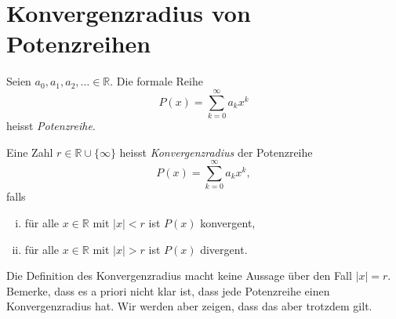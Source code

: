 \documentclass[../main.tex]{subfiles}
\begin{document}
\section{Konvergenzradius von Potenzreihen}\label{sec:radius}
Seien $a_0, a_1, a_2, \dots \in \mathbb{R}$.
Die formale Reihe
\[
  P(x) = \sum_{k=0}^{\infty} a_k x^k
\]
heisst \emph{Potenzreihe}.

\begin{definition}
  Eine Zahl $r \in \mathbb{R} \cup \{\infty\}$ heisst
  \emph{Konvergenzradius} der Potenzreihe 
  \[
    P(x) = \sum_{k=0}^{\infty} a_k x^k,
  \]
  falls
  \begin{enumerate}[(i)]
    \item für alle $x \in \mathbb{R}$ mit $|x| < r$ ist $P(x)$ konvergent,
    \item für alle $x \in \mathbb{R}$ mit $|x| > r$ ist $P(x)$ divergent.
  \end{enumerate}
\end{definition}

Die Definition des Konvergenzradius macht keine Aussage über den Fall $|x| = r$.
Bemerke, dass es a priori nicht klar ist, dass jede Potenzreihe
einen Konvergenzradius hat. Wir werden aber zeigen, dass das aber trotzdem gilt.
\end{document}

